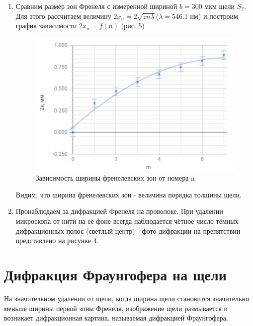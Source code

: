 \documentclass[a4paper]{article}
\begin{document}
\begin{enumerate}
\item Сравним размер зон Френеля с измеренной шириной $b = 300$ мкм щели $S_2$. Для этого рассчитаем величину $2x_n=2\sqrt{zn\lambda}$($\lambda = 546.1$ нм) и построим график зависимости $2x_n = f(n)$ (рис. 5)
\begin{figure}[h]
    \centering
    \includegraphics[width=12cm]{graph_fren.PNG}
    \caption{Зависимость ширины френелевских зон от номера n}
    \label{fig:vac}
\end{figure}

Видим, что ширина френелевских зон - величина порядка толщины щели.

\item Пронаблюдаем за дифракцией Френеля на проволоке. При удалении микроскопа от нити на её фоне всегда наблюдается чётное число тёмных дифракционных полос (светлый центр) - фото дифракции на препятствии представлено на рисунке 4.

\end{enumerate}

\section{Дифракция Фраунгофера на щели}

На значительном удалении от щели, когда ширина щели становится значительно меньше ширины первой зоны Френеля, изображение щели размывается и возникает дифракционная картина, называемая дифракцией Фраунгофера.
\end{document}
